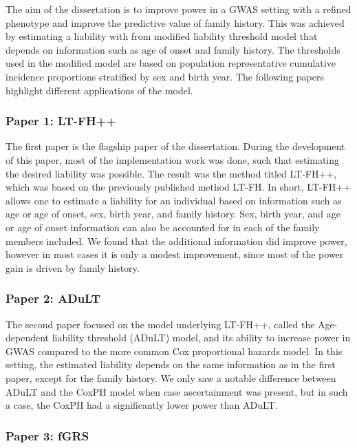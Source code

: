 The aim of the dissertation is to improve power in a GWAS setting with a refined phenotype and improve the predictive value of family history. This was achieved by estimating a liability with from modified liability threshold model that depends on information such as age of onset and family history. The thresholds used in the modified model are based on population representative cumulative incidence proportions stratified by sex and birth year. The following papers highlight different applications of the model.


\subsubsection{Paper 1: LT-FH++}
The first paper is the flagship paper of the dissertation. During the development of this paper, most of the implementation work was done, such that estimating the desired liability was possible. The result was the method titled LT-FH++, which was based on the previously published method LT-FH. In short, LT-FH++ allows one to estimate a liability for an individual based on information such as age or age of onset, sex, birth year, and family history. Sex, birth year, and age or age of onset information can also be accounted for in each of the family members included. We found that the additional information did improve power, however in most cases it is only a modest improvement, since most of the power gain is driven by family history.

\subsubsection{Paper 2: ADuLT}
The second paper focused on the model underlying LT-FH++, called the Age-dependent liability threshold (ADuLT) model, and its ability to increase power in GWAS compared to the more common Cox proportional hazards model. In this setting, the estimated liability depends on the same information as in the first paper, except for the family history. We only saw a notable difference between ADuLT and the CoxPH model when case ascertainment was present, but in such a case, the CoxPH had a significantly lower power than ADuLT.

\subsubsection{Paper 3: fGRS}
